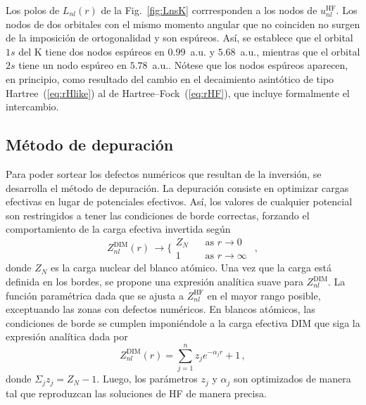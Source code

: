 Los polos de $L_{nl}(r)$ de la Fig.~\ref{fig:LnsK} corrresponden a los 
nodos de $u_{nl}^{\mathrm{HF}}$. Los nodos de dos orbitales con el mismo 
momento angular que no coinciden no surgen de la imposición de 
ortogonalidad y son espúreos. Así, se establece que el orbital $1s$ del 
K tiene dos nodos espúreos en $0.99$~a.u. y $5.68$~a.u., mientras que el 
orbital $2s$ tiene un nodo espúreo en $5.78$~a.u.. Nótese que los nodos 
espúreos aparecen, en principio, como resultado del cambio en el 
decaimiento asintótico de tipo Hartree~(\ref{eq:rHlike}) al de 
Hartree--Fock~(\ref{eq:rHF}), que incluye formalmente el intercambio.

\subsection{Método de depuración}
\label{subsec:depuracion}

Para poder sortear los defectos numéricos que resultan de la inversión, 
se desarrolla el método de depuración. La depuración consiste en 
optimizar cargas efectivas en lugar de potenciales efectivos. Así, los 
valores de cualquier potencial son restringidos a tener las condiciones 
de borde correctas, forzando el comportamiento de la carga efectiva 
invertida según
\begin{equation}
Z_{nl}^{\mathrm{DIM}}(r) \, \rightarrow 
\bigg\{ 
\begin{array}{ll}
Z_{N}  \ \  & \ \ \text{as\ \ }r  \rightarrow 0\  \\ 
1           & \ \ \text{as\ \ }r  \rightarrow \infty \ 
\end{array}\,,
\label{eq:Zasympt}
\end{equation}
donde $Z_N$ es la carga nuclear del blanco atómico. Una vez que la carga 
está definida en los bordes, se propone una expresión analítica suave 
para $Z_{nl}^{\mathrm{DIM}}$. La función paramétrica dada que se ajusta 
a $Z_{nl}^{\mathrm{HF}}$ en el mayor rango posible, exceptuando las 
zonas con defectos numéricos. En blancos atómicos, las condiciones de 
borde se cumplen imponiéndole a la carga efectiva DIM que siga la 
expresión analítica dada por
\begin{equation}
Z_{nl}^{\mathrm{DIM}}(r)= \sum_{j=1}^{n} z_j e^{-\alpha_j r}+1 \,,
\label{eq:atomzDIM}
\end{equation}
donde $\Sigma_j z_j=Z_N-1$. Luego, los parámetros $z_j$ y $\alpha_j$ 
son optimizados de manera tal que reproduzcan las soluciones de HF de 
manera precisa.

